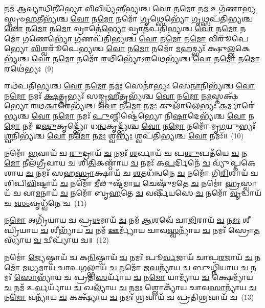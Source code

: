 {\anuvakamend[{\-\ul{𑌕𑍁}\-\-\ul{𑌲𑍁}\-𑌞𑍍𑌚𑌾\-\ul{𑌨𑌾}\-𑌮𑍍𑌪𑌤᳴\-\ul{𑌯𑍇} 𑌨\-\ul{𑌮𑍋} 𑌨𑌮𑍋\-𑌽𑌶𑍍𑌵᳴𑌪𑌤𑌿\-\ul{𑌭𑍍𑌯}\-𑌸𑍍𑌤𑍍𑌰𑍀𑌣𑌿᳴ 𑌚}]}%

𑌨𑌮᳴ 𑌆\-\ul{𑌵𑍍𑌯𑌾}\-𑌧𑌿𑌨𑍀॑𑌭𑍍𑌯𑍋 \ul{𑌵𑌿}\-𑌵𑌿𑌧𑍍𑌯᳴𑌨𑍍𑌤𑍀𑌭𑍍𑌯𑌶𑍍𑌚 \ul{𑌵𑍋} 𑌨\-\ul{𑌮𑍋} 𑌨\-\ul{𑌮} 𑌉𑌗᳴𑌣𑌾𑌭𑍍𑌯𑌸𑍍𑌤𑍃𑍞\-\ul{𑌹}\-𑌤𑍀𑌭𑍍𑌯᳴𑌶𑍍𑌚 \ul{𑌵𑍋} 𑌨\-\ul{𑌮𑍋} 𑌨𑌮𑍋᳴ \ul{𑌗𑍃}\-𑌥𑍍𑌸𑍇𑌭𑍍𑌯𑍋᳴ \ul{𑌗𑍃}\-𑌥𑍍𑌸𑌪᳴𑌤𑌿𑌭𑍍𑌯𑌶𑍍𑌚 \ul{𑌵𑍋} 𑌨\-\ul{𑌮𑍋} 𑌨\-\ul{𑌮𑍋} 𑌵𑍍𑌰𑌾𑌤𑍇॑\-\ul{𑌭𑍍𑌯𑍋} 𑌵𑍍𑌰𑌾𑌤᳴𑌪𑌤𑌿𑌭𑍍𑌯𑌶𑍍𑌚 \ul{𑌵𑍋} 𑌨\-\ul{𑌮𑍋} 𑌨𑌮𑍋᳴ \ul{𑌗}\-𑌣𑍇𑌭𑍍𑌯𑍋᳴ \ul{𑌗}\-𑌣𑌪᳴𑌤𑌿𑌭𑍍𑌯𑌶𑍍𑌚 \ul{𑌵𑍋} 𑌨\-\ul{𑌮𑍋} 𑌨\-\ul{𑌮𑍋} 𑌵𑌿𑌰𑍂᳴𑌪𑍇𑌭𑍍𑌯𑍋 \ul{𑌵𑌿}\-𑌶𑍍𑌵𑌰𑍂᳴𑌪𑍇𑌭𑍍𑌯𑌶𑍍𑌚 \ul{𑌵𑍋} 𑌨\-\ul{𑌮𑍋} 𑌨𑌮𑍋᳴ \ul{𑌮}\-𑌹𑌦𑍍𑌭𑍍𑌯𑌃᳴ 𑌕𑍍𑌷𑍁\-\ul{𑌲𑍍𑌲}\-𑌕𑍇𑌭𑍍𑌯᳴𑌶𑍍𑌚 \ul{𑌵𑍋} 𑌨\-\ul{𑌮𑍋} 𑌨𑌮𑍋᳴ \ul{𑌰}\-𑌥𑌿𑌭𑍍𑌯𑍋᳴\-𑌽\-\ul{𑌰}\-𑌥𑍇𑌭𑍍𑌯᳴𑌶𑍍𑌚 \ul{𑌵𑍋} 𑌨\-\ul{𑌮𑍋} 𑌨\-\ul{𑌮𑍋} 𑌰𑌥𑍇॑𑌭𑍍𑌯𑌃~(9)

𑌰𑌥᳴𑌪𑌤𑌿𑌭𑍍𑌯𑌶𑍍𑌚 \ul{𑌵𑍋} 𑌨\-\ul{𑌮𑍋} 𑌨\-\ul{𑌮𑌃} 𑌸𑍇𑌨𑌾॑𑌭𑍍𑌯𑌃 𑌸𑍇\-\ul{𑌨𑌾}\-𑌨𑌿𑌭𑍍𑌯᳴𑌶𑍍𑌚 \ul{𑌵𑍋} 𑌨\-\ul{𑌮𑍋} 𑌨𑌮𑌃᳴ \ul{𑌕𑍍𑌷}\-𑌤𑍍𑌤𑍃𑌭𑍍𑌯𑌃᳴ 𑌸𑌙𑍍𑌗𑍍𑌰\-\ul{𑌹𑍀}\-𑌤𑍃𑌭𑍍𑌯᳴𑌶𑍍𑌚 \ul{𑌵𑍋} 𑌨\-\ul{𑌮𑍋} 𑌨\-\ul{𑌮}\-𑌸𑍍𑌤𑌕𑍍𑌷᳴𑌭𑍍𑌯𑍋 𑌰𑌥\-\ul{𑌕𑌾}\-𑌰𑍇𑌭𑍍𑌯᳴𑌶𑍍𑌚 \ul{𑌵𑍋} 𑌨\-\ul{𑌮𑍋} 𑌨\-\ul{𑌮𑌃} 𑌕𑍁𑌲𑌾᳴𑌲𑍇𑌭𑍍𑌯𑌃 \ul{𑌕}\-𑌰𑍍𑌮𑌾𑌰𑍇॑𑌭𑍍𑌯𑌶𑍍𑌚 \ul{𑌵𑍋} 𑌨\-\ul{𑌮𑍋} 𑌨𑌮𑌃᳴ \ul{𑌪𑍁}\-𑌞𑍍𑌜𑌿𑌷𑍍𑌟𑍇॑𑌭𑍍𑌯𑍋 𑌨𑌿\-\ul{𑌷𑌾}\-𑌦𑍇𑌭𑍍𑌯᳴𑌶𑍍𑌚 \ul{𑌵𑍋} 𑌨\-\ul{𑌮𑍋} 𑌨𑌮᳴ 𑌇\-\ul{𑌷𑍁}\-𑌕𑍃𑌦𑍍𑌭𑍍𑌯𑍋᳴ 𑌧\-\ul{𑌨𑍍𑌵}\-𑌕𑍃𑌦𑍍𑌭𑍍𑌯᳴𑌶𑍍𑌚 \ul{𑌵𑍋} 𑌨\-\ul{𑌮𑍋} 𑌨𑌮𑍋᳴ 𑌮𑍃\-\ul{𑌗}\-𑌯𑍁𑌭𑍍𑌯𑌃᳴ \ul{𑌶𑍍𑌵}\-𑌨𑌿𑌭𑍍𑌯᳴𑌶𑍍𑌚 \ul{𑌵𑍋} 𑌨\-\ul{𑌮𑍋} 𑌨\-\ul{𑌮𑌃} 𑌶𑍍𑌵\-\ul{𑌭𑍍𑌯𑌃} 𑌶𑍍𑌵𑌪᳴𑌤𑌿𑌭𑍍𑌯𑌶𑍍𑌚 \ul{𑌵𑍋} 𑌨𑌮𑌃᳴॥~(10)

{\anuvakamend[{𑌰𑌥𑍇॑\-\ul{𑌭𑍍𑌯𑌃} 𑌶𑍍𑌵𑌪᳴𑌤𑌿𑌭𑍍𑌯\-\ul{𑌶𑍍𑌚} 𑌦𑍍𑌵𑍇 𑌚᳴}]}%

𑌨𑌮𑍋᳴ \ul{𑌭}\-𑌵𑌾𑌯᳴ 𑌚 \ul{𑌰𑍁}\-𑌦𑍍𑌰𑌾𑌯᳴ \ul{𑌚} 𑌨𑌮𑌃᳴ \ul{𑌶}\-𑌰𑍍𑌵𑌾𑌯᳴ 𑌚 𑌪\-\ul{𑌶𑍁}\-𑌪𑌤᳴𑌯𑍇 \ul{𑌚} 𑌨\-\ul{𑌮𑍋} 𑌨𑍀𑌲᳴𑌗𑍍𑌰𑍀𑌵𑌾𑌯 𑌚 𑌶𑌿\-\ul{𑌤𑌿}\-𑌕𑌣𑍍𑌠𑌾᳴𑌯 \ul{𑌚} 𑌨𑌮𑌃᳴ 𑌕\-\ul{𑌪}\-𑌰𑍍𑌦𑌿𑌨𑍇᳴ \ul{𑌚} 𑌵𑍍𑌯𑍁᳴𑌪𑍍𑌤𑌕𑍇𑌶𑌾𑌯 \ul{𑌚} 𑌨𑌮𑌃᳴ 𑌸𑌹\-\ul{𑌸𑍍𑌰𑌾}\-𑌕𑍍𑌷𑌾𑌯᳴ 𑌚 \ul{𑌶}\-𑌤𑌧᳴𑌨𑍍𑌵𑌨𑍇 \ul{𑌚} 𑌨𑌮𑍋᳴ 𑌗𑌿\-\ul{𑌰𑌿}\-𑌶𑌾𑌯᳴ 𑌚 𑌶𑌿𑌪𑌿\-\ul{𑌵𑌿}\-𑌷𑍍𑌟𑌾𑌯᳴ \ul{𑌚} 𑌨𑌮𑍋᳴ \ul{𑌮𑍀}\-𑌢𑍁𑌷𑍍𑌟᳴𑌮𑌾\-\ul{𑌯} 𑌚𑍇𑌷𑍁᳴𑌮𑌤𑍇 \ul{𑌚} 𑌨𑌮𑍋॑ \ul{𑌹𑍍𑌰}\-𑌸𑍍𑌵𑌾𑌯᳴ 𑌚 𑌵𑌾\-\ul{𑌮}\-𑌨𑌾𑌯᳴ \ul{𑌚} 𑌨𑌮𑍋᳴ 𑌬𑍃\-\ul{𑌹}\-𑌤𑍇 \ul{𑌚} 𑌵𑌰𑍍\mbox{}𑌷𑍀᳴𑌯𑌸𑍇 \ul{𑌚} 𑌨𑌮𑍋᳴ \ul{𑌵𑍃}\-𑌦𑍍𑌧𑌾𑌯᳴ 𑌚 \ul{𑌸𑌂}\-𑌵𑍃𑌧𑍍𑌵᳴𑌨𑍇 𑌚~(11)

𑌨\-\ul{𑌮𑍋} 𑌅𑌗𑍍𑌰𑌿᳴𑌯𑌾𑌯 𑌚 𑌪𑍍𑌰\-\ul{𑌥}\-𑌮𑌾𑌯᳴ \ul{𑌚} 𑌨𑌮᳴ \ul{𑌆}\-𑌶𑌵𑍇᳴ 𑌚𑌾\-\ul{𑌜𑌿}\-𑌰𑌾𑌯᳴ \ul{𑌚} 𑌨\-\ul{𑌮𑌃} 𑌶𑍀𑌘𑍍𑌰𑌿᳴𑌯𑌾𑌯 \ul{𑌚} 𑌶𑍀𑌭𑍍𑌯𑌾᳴𑌯 \ul{𑌚} 𑌨𑌮᳴ \ul{𑌊}\-𑌰𑍍𑌮𑍍𑌯𑌾᳴𑌯 𑌚𑌾𑌵\-\ul{𑌸𑍍𑌵}\-𑌨𑍍𑌯𑌾᳴𑌯 \ul{𑌚} 𑌨𑌮𑌃᳴ 𑌸𑍍𑌰𑍋\-\ul{𑌤}\-𑌸𑍍𑌯𑌾᳴𑌯 \ul{𑌚} 𑌦𑍍𑌵𑍀𑌪𑍍𑌯𑌾᳴𑌯 𑌚॥~(12)

{\anuvakamend[{\-\ul{𑌸𑌂} 𑌵𑍃𑌧𑍍𑌵᳴𑌨𑍇 \ul{𑌚} 𑌪𑌞𑍍𑌚᳴𑌵𑌿𑍞𑌶𑌤𑌿𑌶𑍍𑌚}]}%

𑌨𑌮𑍋॑ \ul{𑌜𑍍𑌯𑍇}\-𑌷𑍍𑌠𑌾𑌯᳴ 𑌚 𑌕\-\ul{𑌨𑌿}\-𑌷𑍍𑌠𑌾𑌯᳴ \ul{𑌚} 𑌨𑌮𑌃᳴ 𑌪𑍂\-\ul{𑌰𑍍𑌵}\-𑌜𑌾𑌯᳴ 𑌚𑌾𑌪\-\ul{𑌰}\-𑌜𑌾𑌯᳴ \ul{𑌚} 𑌨𑌮𑍋᳴ 𑌮\-\ul{𑌧𑍍𑌯}\-𑌮𑌾𑌯᳴ 𑌚𑌾𑌪\-\ul{𑌗}\-𑌲𑍍𑌭𑌾𑌯᳴ \ul{𑌚} 𑌨𑌮𑍋᳴ 𑌜\-\ul{𑌘}\-𑌨𑍍𑌯𑌾᳴𑌯 \ul{𑌚} 𑌬𑍁𑌧𑍍𑌨𑌿᳴𑌯𑌾𑌯 \ul{𑌚} 𑌨𑌮𑌃᳴ \ul{𑌸𑍋}\-𑌭𑍍𑌯𑌾᳴𑌯 𑌚 𑌪𑍍𑌰𑌤𑌿\-\ul{𑌸}\-𑌰𑍍𑌯𑌾᳴𑌯 \ul{𑌚} 𑌨\-\ul{𑌮𑍋} 𑌯𑌾𑌮𑍍𑌯𑌾᳴𑌯 \ul{𑌚} 𑌕𑍍𑌷𑍇𑌮𑍍𑌯𑌾᳴𑌯 \ul{𑌚} 𑌨𑌮᳴ 𑌉\-\ul{𑌰𑍍𑌵}\-𑌰𑍍𑌯𑌾᳴𑌯 \ul{𑌚} 𑌖𑌲𑍍𑌯𑌾᳴𑌯 \ul{𑌚} 𑌨\-\ul{𑌮𑌃} 𑌶𑍍𑌲𑍋𑌕𑍍𑌯𑌾᳴𑌯 𑌚𑌾𑌵\-\ul{𑌸𑌾}\-𑌨𑍍𑌯𑌾᳴𑌯 \ul{𑌚} 𑌨\-\ul{𑌮𑍋} 𑌵𑌨𑍍𑌯𑌾᳴𑌯 \ul{𑌚} 𑌕𑌕𑍍𑌷𑍍𑌯𑌾᳴𑌯 \ul{𑌚} 𑌨𑌮𑌃᳴ \ul{𑌶𑍍𑌰}\-𑌵𑌾𑌯᳴ 𑌚 𑌪𑍍𑌰𑌤𑌿\-\ul{𑌶𑍍𑌰}\-𑌵𑌾𑌯᳴ 𑌚~(13)

